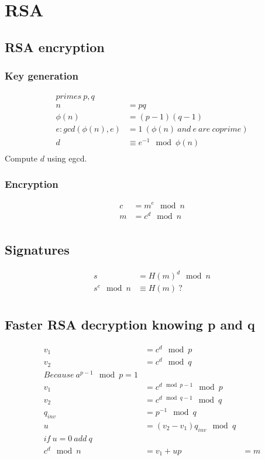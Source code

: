 \documentclass{article}
\begin{document}
\section{RSA}
\subsection{RSA encryption}
\subsubsection{Key generation}
\begin{align*}
primes~p, q \\
n &= pq \\
\phi(n) &= (p-1)(q-1) \\
e : gcd(\phi(n), e) &= 1~(\phi(n)~and~e~are~coprime) \\
d &\equiv e^{-1} \mod \phi(n) \\
\end{align*}
Compute $d$ using egcd.

\subsubsection{Encryption}
\begin{align*}
    c &= m^e \mod n \\
    m &= c^d \mod n \\
\end{align*}

\subsection{Signatures}
\begin{align*}
s &= H(m)^d \mod n \\
 s^e \mod n &\equiv H(m)~? \\
\end{align*}

\subsection{Faster RSA decryption knowing p and q}
\begin{align*}
v_1 &= c^d \mod p \\
v_2 &= c^d \mod q \\
Because~a^{p-1} \mod p = 1 \\
v_1 &= c^{d \mod p-1} \mod p \\
v_2 &= c^{d \mod q-1} \mod q \\
q_{inv} &= p^{-1} \mod q \\
u &= (v_2 - v_1)q_{inv} \mod q \\
if~u=0~add~q\\
c^d \mod n &= v_1 + up &= m \\
\end{align*}
\end{document}
